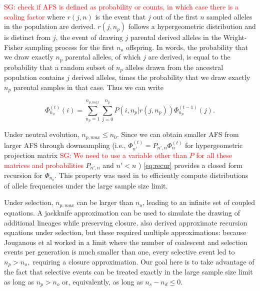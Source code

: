 \documentclass[review]{elsarticle}
\newcommand{\afs}[2]{\Phi_{#1}^{(#2)}}
\newcommand{\sgcomment}[1]{\textcolor{red}{SG: #1}}
\begin{document}
\sgcomment{check if AFS is defined as probability or counts, in which case
there is a scaling factor} where $r(j,n)$ is the event that $j$ out of the
first $n$ sampled alleles in the population are derived. $r(j,n_p)$ follows a
hypergeometric distribution and is distinct from $j$, the event of drawing $j$
parental derived alleles in the Wright-Fisher sampling process for the first
$n_o$ offspring. In words, the probability that we draw exactly $n_p$ parental
alleles, of which $j$ are derived, is equal to the probability that a random
subset of $n_p$ alleles drawn from the ancestral population contains $j$
derived alleles, times the probability that we draw exactly $n_p$ parental
samples in that case. Thus we can write

\begin{equation}
\label{eq:recur}
 \afs{n_o}{t}(i)= \sum_{n_p=1}^{n_{p,max}} \sum_{j=0}^{n_p} P(i, n_p | r(j,n_p)) \afs{n_p}{t-1}(j).
\end{equation}

Under neutral evolution, $n_{p,max}\leq n_0$. Since we can obtain smaller AFS from larger AFS through downsampling (i.e., $\afs{n'}{t}  = P_{n',n} \afs{n}{t}$ for hypergeometric projection matrix \sgcomment{We need to use a variable other than $P$ for all these matrices and probabilities} $P_{n',n}$ and $n'<n$ )  \eqref{eq:recur} provides a closed form recursion for $\Phi_{n_o}.$ 
This property was used in \cite{JouganousEtAl2017} to efficiently compute distributions of allele frequencies under the large sample size limit.  

Under selection, $n_{p,max}$ can be larger than $n_o$, leading to an infinite set of coupled equations. A jackknife approximation can be used to simulate the drawing of additional lineages while preserving closure.
\cite{JouganousEtAl2017} also derived approximate recursion equations under selection, but these required multiple approximations: because Jouganous et al worked in a limit where the number of coalescent and selection events per generation is much smaller than one, every selective event led to $n_p> n_o,$ requiring a closure approximation.  
Our goal here is to take advantage of the fact that selective events can be treated exactly in the large sample size limit as long as  $n_p > n_o$ or,  equivalently, as long as  $n_s - n_d \leq 0.$
 
\end{document}
